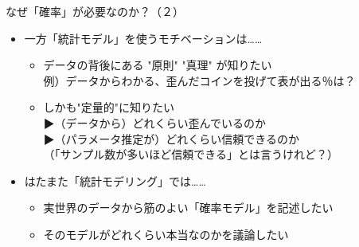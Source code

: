 \documentclass[dvipdfmx,cjk]{beamer}
\begin{document}
\begin{frame}{なぜ「確率」が必要なのか？（２）}

\begin{itemize}

    \item 一方「統計モデル」を使うモチベーションは……
        \begin{itemize}
        \item データの背後にある "原則" "真理" が知りたい\\
        例）データからわかる、歪んだコインを投げて表が出る％は？
        \item しかも"定量的"に知りたい\\
        ▶（データから）どれくらい歪んでいるのか\\
        ▶（パラメータ推定が）どれくらい信頼できるのか\\
        （「サンプル数が多いほど信頼できる」とは言うけれど？）
        \end{itemize}

    \item はたまた「統計モデリング」では……
        \begin{itemize}
        \item 実世界のデータから筋のよい「確率モデル」を記述したい
        \item そのモデルがどれくらい本当なのかを議論したい
        \end{itemize}



\end{itemize}

\end{frame}
\end{document}
